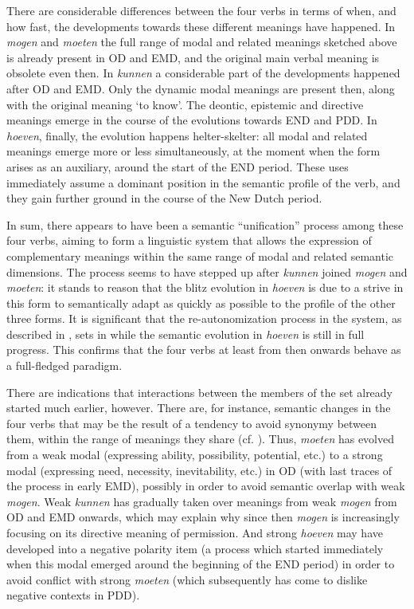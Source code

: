 \documentclass[output=paper]{langsci/langscibook}
\begin{document}
There are considerable differences between the four verbs in terms of when, and how fast, the developments towards these different meanings have happened. In \textit{mogen} and \textit{moeten} the full range of modal and related meanings sketched above is already present in OD and EMD, and the original main verbal meaning is obsolete even then. In \textit{kunnen} a considerable part of the developments happened after OD and EMD. Only the dynamic modal meanings are present then, along with the original meaning ‘to know’. The deontic, epistemic and directive meanings emerge in the course of the evolutions towards END and PDD. In \textit{hoeven}, finally, the evolution happens helter-skelter: all modal and related meanings emerge more or less simultaneously, at the moment when the form arises as an auxiliary, around the start of the END period. These uses immediately assume a dominant position in the semantic profile of the verb, and they gain further ground in the course of the New Dutch period. 

In sum, there appears to have been a semantic “unification” process among these four verbs, aiming to form a linguistic system that allows the expression of complementary meanings within the same range of modal and related semantic dimensions. The process seems to have stepped up after \textit{kunnen} joined \textit{mogen} and \textit{moeten}: it stands to reason that the blitz evolution in \textit{hoeven} is due to a strive in this form to semantically adapt as quickly as possible to the profile of the other three forms. It is significant that the re-autonomization process in the system, as described in , sets in while the semantic evolution in \textit{hoeven} is still in full progress. This confirms that the four verbs at least from then onwards behave as a full-fledged paradigm.

There are indications that interactions between the members of the set already started much earlier, however. There are, for instance, semantic changes in the four verbs that may be the result of a tendency to avoid synonymy between them, within the range of meanings they share (cf. \citealt{NuytsByloo2015}). Thus, \textit{moeten} has evolved from a weak modal (expressing ability, possibility, potential, etc.) to a strong modal (expressing need, necessity, inevitability, etc.) in OD (with last traces of the process in early EMD), possibly in order to avoid semantic overlap with weak \textit{mogen}. Weak \textit{kunnen} has gradually taken over meanings from weak \textit{mogen} from OD and EMD onwards, which may explain why since then \textit{mogen} is increasingly focusing on its directive meaning of permission. And strong \textit{hoeven} may have developed into a negative polarity item (a process which started immediately when this modal emerged around the beginning of the END period) in order to avoid conflict with strong \textit{moeten} (which subsequently has come to dislike negative contexts in PDD).
\end{document}
